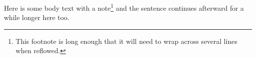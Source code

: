 Here is some body text with a note\footnote{This
footnote is long enough that it will need to wrap
across several lines when reflowed.} and the
sentence continues afterward for a while longer
here too.
